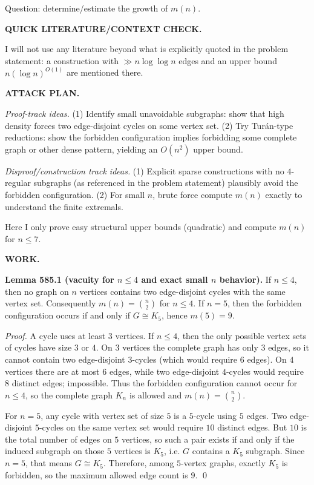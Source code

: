 Question: determine/estimate the growth of $m(n)$.

\bigskip
\noindent\textbf{QUICK LITERATURE/CONTEXT CHECK.}

I will not use any literature beyond what is explicitly quoted in the problem statement: a construction with $\gg n\log\log n$ edges and an upper bound $n(\log n)^{O(1)}$ are mentioned there.

\bigskip
\noindent\textbf{ATTACK PLAN.}

\emph{Proof-track ideas.}
(1) Identify small unavoidable subgraphs: show that high density forces two edge-disjoint cycles on some vertex set.
(2) Try Tur\'an-type reductions: show the forbidden configuration implies forbidding some complete graph or other dense pattern, yielding an $O(n^2)$ upper bound.

\emph{Disproof/construction track ideas.}
(1) Explicit sparse constructions with no $4$-regular subgraphs (as referenced in the problem statement) plausibly avoid the forbidden configuration.
(2) For small $n$, brute force compute $m(n)$ exactly to understand the finite extremals.

Here I only prove easy structural upper bounds (quadratic) and compute $m(n)$ for $n\le 7$.

\bigskip
\noindent\textbf{WORK.}

\noindent\textbf{Lemma 585.1 (vacuity for $n\le 4$ and exact small $n$ behavior).}
If $n\le 4$, then no graph on $n$ vertices contains two edge-disjoint cycles with the same vertex set.
Consequently $m(n)=\binom n2$ for $n\le 4$.
If $n=5$, then the forbidden configuration occurs if and only if $G\cong K_5$, hence $m(5)=9$.

\noindent\emph{Proof.}
A cycle uses at least $3$ vertices.
If $n\le 4$, then the only possible vertex sets of cycles have size $3$ or $4$.
On $3$ vertices the complete graph has only $3$ edges, so it cannot contain two edge-disjoint $3$-cycles (which would require $6$ edges).
On $4$ vertices there are at most $6$ edges, while two edge-disjoint $4$-cycles would require $8$ distinct edges; impossible.
Thus the forbidden configuration cannot occur for $n\le 4$, so the complete graph $K_n$ is allowed and $m(n)=\binom n2$.

For $n=5$, any cycle with vertex set of size $5$ is a $5$-cycle using $5$ edges.
Two edge-disjoint $5$-cycles on the same vertex set would require $10$ distinct edges.
But $10$ is the total number of edges on $5$ vertices, so such a pair exists if and only if the induced subgraph on those $5$ vertices is $K_5$, i.e. $G$ contains a $K_5$ subgraph. Since $n=5$, that means $G\cong K_5$.
Therefore, among $5$-vertex graphs, exactly $K_5$ is forbidden, so the maximum allowed edge count is $9$.
\qed

